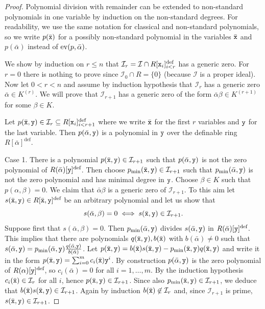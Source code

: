 \documentclass{amsart}
\newcommand{\ca}{\mathcal}
\newcommand{\ideal}[1]{\ca #1}
\newcommand{\nin}{\not \in}
\theoremstyle{plain}
\theoremstyle{definition}
\newcommand{\ev}{\textnormal{ev}}
\newcommand{\polyn}[2]{{#1}[{\tt x}_i]_{i<#2}^\text{def}}
\begin{document}
\begin{proof} Polynomial division with remainder can be extended to non-standard polynomials in one variable by induction on the non-standard degrees. For readability, we use the same notation for classical and non-standard polynomials, so we write $p(\bar {\tt x})$ for a possibly non-standard polynomial in the variables $\bar {\tt x}$ and $p(\bar \alpha)$ instead of $\ev(p, \bar \alpha)$. 

We show by induction on $r\leq n$ that ${\ideal I}_r = \ideal I \cap \polyn R r$ has a generic zero. For $r=0$ there is nothing to prove since $\ideal I_0 \cap R = \{0\}$ (because $\ideal I$ is a proper ideal). Now let $0<r<n$ and assume by induction hypothesis that ${\ideal I}_r$ has a generic zero $\bar \alpha\in K^{(r)}$. We will prove that $\ideal I_{r+1}$ has a generic zero of the form $\bar \alpha \beta\in K^{(r+1)}$ for some $\beta\in K$. 

Let $p(\bar {\tt x}, {\tt y}) \in {\ideal I}_r \subseteq \polyn R {r+1}$ where we write $\bar {\tt x}$ for the first $r$ variables and $\tt y$ for the last variable. Then $p(\bar \alpha, {\tt y})$ is a polynomial in $\tt y$ over the definable ring $R [\bar \alpha]^{\text{def}}$. 

\smallskip 
Case 1. There is a polynomial $p(\bar {\tt x}, {\tt y})\in \ideal I_{r+1}$ such that $p(\bar \alpha, {\tt y})$ is not the zero polynomial of $R(\bar \alpha)[\tt y]^{\text{def}}$. Then choose $p_{\min}(\bar {\tt x}, {\tt y}) \in \ideal I_{r+1}$ such that $p_{\min}(\bar \alpha, {\tt y})$ is not the zero polynomial and has minimal degree in $\tt y$. Choose $\beta \in K$ such that $p(\alpha, \beta) = 0$. We claim that $\bar \alpha \beta$ is a generic zero of ${\ideal I}_{r+1}$. To this aim let $s(\bar {\tt x}, {\tt y})\in R[\bar {\tt x}, \tt y]^{\text{def}}$ be an arbitrary polynomial and let us show that 
%
$$s(\bar \alpha, \beta) = 0 \iff s(\bar {\tt x}, {\tt y}) \in \ideal I_{r+1}.$$ 
%
Suppose first that $s(\bar \alpha, \beta) = 0$. Then $p_{\min}(\bar \alpha, {\tt y})$ divides $s(\bar \alpha, {\tt y})$ in $R(\bar \alpha)[\tt y]^{\text{def}}$. This implies that there are polynomials $q(\bar {\tt x}, {\tt y}), b(\bar {\tt x})$ with $b(\bar \alpha) \neq 0$ such that 
%
$s(\bar \alpha, {\tt y}) = p_{\min}(\bar \alpha, {\tt y}) \frac {q(\bar \alpha, {\tt y})}{b(\bar \alpha)}$.
%
 Let $p(\bar {\tt x}, {\tt y}) = b(\bar {\tt x}) s(\bar {\tt x}, {\tt y}) - p_{\min}(\bar {\tt x}, {\tt y}) q(\bar {\tt x}, {\tt y})$ and write it in the form $p(\bar {\tt x}, {\tt y}) = \sum_{i=0}^m c_i(\bar {\tt x}) {\tt y}^i$. By construction $p(\bar \alpha, {\tt y})$ is the zero polynomial of $R(\alpha)[\tt y]^{\text{def}}$, so $c_i(\bar \alpha) = 0$ for all $i=1, \ldots, m$.  By the induction hypothesis $c_i(\bar {\tt x}) \in {\ideal I}_r$ for all $i$, hence $p(\bar {\tt x}, {\tt y}) \in \ideal I_{r+1}$. Since also $p_{\min}(\bar {\tt x}, {\tt y}) \in \ideal I_{r+1}$, we deduce that $b(\bar {\tt x}) s(\bar {\tt x}, {\tt y}) \in \ideal I_{r+1}$. Again by induction $b(\bar {\tt x}) \nin \ideal I_{r}$ and, since ${\ideal I}_{r+1}$ is prime, $s(\bar {\tt x}, {\tt y}) \in \ideal I_{r+1}$. 


\end{proof}
\end{document}
